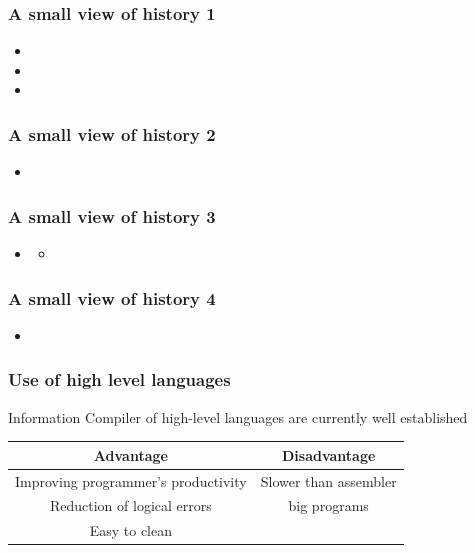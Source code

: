 \documentclass{beamer}
\begin{document}
\begin{frame}
\frametitle{A small view of history 1}
\begin{itemize}
\item
\item
\item
\end{itemize}
\end{frame}


\begin{frame}
\frametitle{A small view of history 2}
\begin{itemize}
\item
\end{itemize}
\end{frame}


\begin{frame}
\frametitle{A small view of history 3}
\begin{itemize}
\item
\begin{itemize}
\item
\end{itemize}
\end{itemize}
\end{frame}


\begin{frame}
\frametitle{A small view of history 4}
\begin{itemize}
\item
\end{itemize}
\end{frame}


\begin{frame}
\frametitle{Use of high level languages}
\begin{block}{Information}
Compiler of high-level languages are currently well established
\end{block}
\begin{table}
\begin{tabular}{|c|c|}
\hline
Advantage & Disadvantage\\
\hline
Improving programmer's productivity& Slower than assembler\\
\hline
Reduction of logical errors& big programs\\
\hline
Easy to clean &\\
\hline
\end{tabular}
\end{table}
\end{frame}
\end{document}

